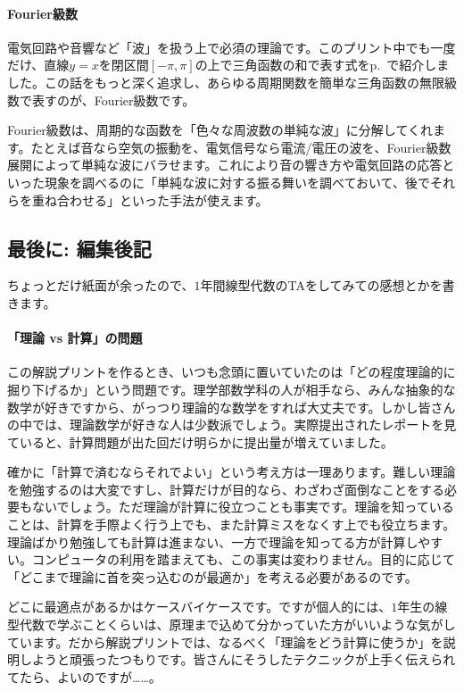 \paragraph{Fourier級数}

電気回路や音響など「波」を扱う上で必須の理論です。このプリント中でも一度だけ、直線$y = x$を閉区間$[-\pi, \pi]$の上で三角函数の和で表す式をp.~\pageref{paragraph:Fourier_series}で紹介しました。この話をもっと深く追求し、あらゆる周期関数を簡単な三角函数の無限級数で表すのが、Fourier級数です。

Fourier級数は、周期的な函数を「色々な周波数の単純な波」に分解してくれます。たとえば音なら空気の振動を、電気信号なら電流/電圧の波を、Fourier級数展開によって単純な波にバラせます。これにより音の響き方や電気回路の応答といった現象を調べるのに「単純な波に対する振る舞いを調べておいて、後でそれらを重ね合わせる」といった手法が使えます。

\subsection{最後に: 編集後記}

ちょっとだけ紙面が余ったので、$1$年間線型代数のTAをしてみての感想とかを書きます。

\paragraph{「理論 vs 計算」の問題}

この解説プリントを作るとき、いつも念頭に置いていたのは「どの程度理論的に掘り下げるか」という問題です。理学部数学科の人が相手なら、みんな抽象的な数学が好きですから、がっつり理論的な数学をすれば大丈夫です。しかし皆さんの中では、理論数学が好きな人は少数派でしょう。実際提出されたレポートを見ていると、計算問題が出た回だけ明らかに提出量が増えていました。

確かに「計算で済むならそれでよい」という考え方は一理あります。難しい理論を勉強するのは大変ですし、計算だけが目的なら、わざわざ面倒なことをする必要もないでしょう。ただ理論が計算に役立つことも事実です。理論を知っていることは、計算を手際よく行う上でも、また計算ミスをなくす上でも役立ちます。理論ばかり勉強しても計算は進まない、一方で理論を知ってる方が計算しやすい。コンピュータの利用を踏まえても、この事実は変わりません。目的に応じて「どこまで理論に首を突っ込むのが最適か」を考える必要があるのです。

どこに最適点があるかはケースバイケースです。ですが個人的には、$1$年生の線型代数で学ぶことくらいは、原理まで込めて分かっていた方がいいような気がしています。だから解説プリントでは、なるべく「理論をどう計算に使うか」を説明しようと頑張ったつもりです。皆さんにそうしたテクニックが上手く伝えられてたら、よいのですが……。

